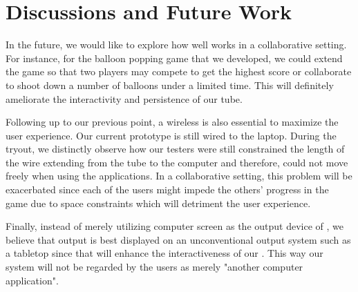 \section{Discussions and Future Work}\label{sec:fut-work}

In the future, we would like to explore how well \tube works in a collaborative setting. For instance, for the balloon popping game that we developed, we could extend the game so that two players may compete to get the highest score or collaborate to shoot down a number of balloons under a limited time. This will definitely ameliorate the interactivity and persistence of our tube.

Following up to our previous point, a wireless \tube is also essential to maximize the user experience. Our current \tube prototype is still wired to the laptop. During the tryout, we distinctly observe how our testers were still constrained the length of the wire extending from the tube to the computer and therefore, could not move freely when using the applications. In a collaborative setting, this problem will be exacerbated since each of the users might impede the others' progress in the game due to space constraints which will detriment the user experience.

Finally, instead of merely utilizing computer screen as the output device of \tube, we believe that \tube output is best displayed on an unconventional output system such as a tabletop since that will enhance the interactiveness of our \tube. This way our \tube system will not be regarded by the users as merely "another computer application".
